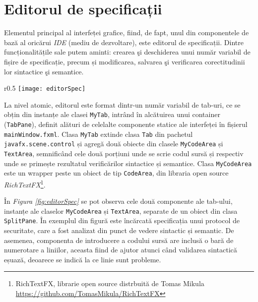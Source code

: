 \section{Editorul de specificații}
Elementul principal al interfeței grafice, fiind, de fapt, unul din componentele de bază al oricărui \textit{IDE} (mediu de dezvoltare), este editorul de specificații. Dintre funcționalitățile sale putem aminti: crearea şi deschiderea unui număr variabil de fișire de specificație, precum și modificarea, salvarea şi verificarea corectitudinii lor sintactice şi semantice.
\par
\begin{wrapfigure}{r}{0.5\textwidth}
	\centering
	\texttt{[image: editorSpec]}
    \caption{Editorul de specificaţii}
    \label{fig:editorSpec}
\end{wrapfigure}
La nivel atomic, editorul este format dintr-un număr variabil de tab-uri, ce se obțin din instanțe ale clasei \texttt{MyTab}, intrând în alcătuirea unui container (\texttt{TabPane}), definit alături de celelalte componente statice ale interfeței în fișierul \texttt{mainWindow.fxml}. Clasa \texttt{MyTab} extinde clasa \texttt{Tab} din pachetul \texttt{javafx.scene.control} și agregă două obiecte din clasele \texttt{MyCodeArea} și \texttt{TextArea}, semnificând cele două porțiuni unde se scrie codul sursă și respectiv unde se primește rezultatul verificărilor sintactice și semantice. Clasa \texttt{MyCodeArea} este un wrapper peste un obiect de tip \texttt{CodeArea}, din libraria open source \textit{RichTextFX}\footnote{RichTextFX, librarie open source distrbuită de Tomas Mikula \url{https://github.com/TomasMikula/RichTextFX}}.
\par
În \textit{Figura \ref{fig:editorSpec}} se pot observa cele două componente ale tab-ului, instanțe ale claselor \texttt{MyCodeArea} și \texttt{TextArea}, separate de un obiect din clasa \texttt{SplitPane}. În exemplul din figură este încărcată specificația unui protocol de securitate, care a fost analizat din punct de vedere sintactic și semantic. De asemenea, componenta de introducere a codului sursă are inclusă o bară de numerotare a liniilor, aceasta fiind de ajutor atunci când validarea sintactică eșuază, deoarece se indică la ce linie sunt probleme.
\newpage
